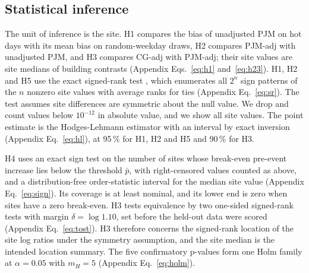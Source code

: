 \begin{algorithm}[t]
\caption{DispatchStressTest: error growth under repeated dispatch}\label{alg:dispatch}
\end{algorithm}

\subsection{Statistical inference}\label{sec:methods:inference}

The unit of inference is the site. H1 compares the bias of unadjusted PJM on hot days with its mean bias on random-weekday draws, H2 compares PJM-adj with unadjusted PJM, and H3 compares CG-adj with PJM-adj; their site values are site medians of building contrasts (Appendix Eqs.~\eqref{eq:h1} and~\eqref{eq:h23}). H1, H2 and H5 use the exact signed-rank test \cite{wilcoxon1945}, which enumerates all $2^{n}$ sign patterns of the $n$ nonzero site values with average ranks for ties (Appendix Eq.~\eqref{eq:sr}). The test assumes site differences are symmetric about the null value. We drop and count values below $10^{-12}$ in absolute value, and we show all site values. The point estimate is the Hodges-Lehmann estimator with an interval by exact inversion \cite{hodges1963} (Appendix Eq.~\eqref{eq:hl}), at 95\,\% for H1, H2 and H5 and 90\,\% for H3.

H4 uses an exact sign test on the number of sites whose break-even pre-event increase lies below the threshold $\bar{p}$, with right-censored values counted as above, and a distribution-free order-statistic interval for the median site value (Appendix Eq.~\eqref{eq:sign}). Its coverage is at least nominal, and its lower end is zero when sites have a zero break-even. H3 tests equivalence by two one-sided signed-rank tests \cite{schuirmann1987} with margin $\delta=\log 1.10$, set before the held-out data were scored (Appendix Eq.~\eqref{eq:tost}). H3 therefore concerns the signed-rank location of the site log ratios under the symmetry assumption, and the site median is the intended location summary. The five confirmatory p-values form one Holm family at $\alpha=0.05$ with $m_H=5$ \cite{holm1979} (Appendix Eq.~\eqref{eq:holm}).

